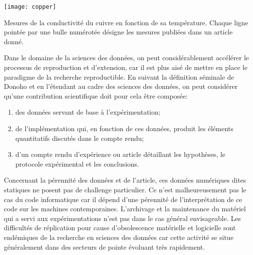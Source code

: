 \begin{marginfigure}
  \texttt{[image: copper]}
  \caption{Mesures de la conductivité du cuivre en fonction de sa température. Chaque ligne pointée par une bulle numérotée désigne les mesures publiées dans un article donné.}
  \label{fig:copper}
\end{marginfigure}

Dans le domaine de la sciences des données, on peut considérablement accélérer le processus de reproduction et d'extension, car il est plus aisé de mettre en place le paradigme de la recherche reproductible. En suivant la définition séminale de Donoho et en l'étendant au cadre des sciences des données, on peut considérer qu'une contribution scientifique doit pour cela être composée:
\begin{enumerate}
  \item des données servant de base à l'expérimentation;
  \item de l'implémentation qui, en fonction de ces données, produit les éléments quantitatifs discutés dans le compte rendu;
  \item d'un compte rendu d'expérience ou article détaillant les hypothèses, le protocole expérimental et les conclusions.
\end{enumerate}

Concernant la pérennité des données et de l'article, ces données numériques dites \og statiques \fg ne posent pas de challenge particulier. Ce n'est malheureusement pas le cas du code informatique car il dépend d'une pérennité de l'interprétation de ce code sur les machines contemporaines. L'archivage et la maintenance du matériel qui a servi aux expérimentations n'est pas dans le cas général envisageable. Les difficultés de réplication pour cause d'obsolescence matérielle et logicielle sont endémiques de la recherche en sciences des données car cette activité se situe généralement dans des secteurs de pointe évoluant très rapidement.

